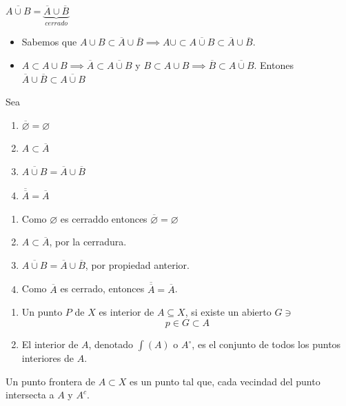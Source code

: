 \begin{prop}
    $\overline{A\cup B}=\underbrace{\overline{A}\cup \overline{B}}_{cerrado}$
    \begin{dem}
        \begin{itemize}
            \item Sabemos que $A\cup B\subset \overline{A}\cup \overline{B}\implies A\cup \subset \overline{A\cup B}\subset \overline{A}\cup \overline{B}.$
            \item $A\subset A\cup B\implies \overline{A}\subset \overline{A\cup B}$ y $B\subset A\cup B\implies \overline{B}\subset \overline{A\cup B}$. Entones $\overline{A}\cup\overline{B}\subset \overline{A\cup B}$
        \end{itemize}
    \end{dem}
\end{prop}

\begin{teorema}
    Sea \begin{enumerate}
        \item $\overline{\varnothing}=\varnothing$
        \item $A\subset \overline{A}$
        \item $\overline{A\cup B}=\overline{A}\cup \overline{B}$
        \item $\overline{\overline{A}}=\overline{A}$
    \end{enumerate}


    \begin{dem}
        \begin{enumerate}
            \item Como $\varnothing$ es cerraddo entonces $\overline{\varnothing}=\varnothing$
            \item $A\subset \overline{A}$, por la cerradura. 
            \item $\overline{A\cup B}=\overline{A}\cup \overline{B}$, por propiedad anterior. 
            \item Como $\overline{A}$ es cerrado, entonces $\overline{\overline{A}}=\overline{A}$.
        \end{enumerate}
    \end{dem}
    
\end{teorema}

\begin{definicion}
    \begin{enumerate}
        \item Un punto $P$ de $X$ es interior de $A\subseteq X$, si existe un abierto $G\ni$
        $$p\in G\subset A$$
        \item El interior de $A$, denotado $\int(A)$ o $A^{\circ}$, es el conjunto de todos los puntos interiores de $A$. 
    \end{enumerate}
    
\end{definicion}
\begin{definicion}
    Un punto frontera de $A\subset X$ es un punto tal que, cada vecindad del punto intersecta a $A$ y $A^c$.
\end{definicion}

